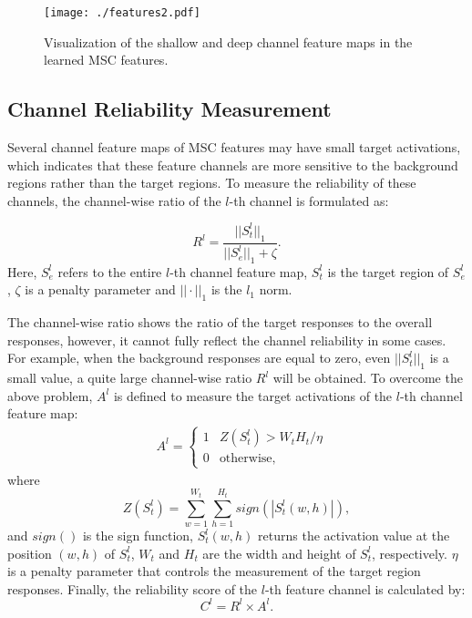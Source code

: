 \documentclass[runningheads]{llncs}
\begin{document}
\begin{figure*}[!tp]
\begin{center}
   \texttt{[image: ./features2.pdf]} %
\end{center}
 \caption{Visualization of the shallow and deep channel feature maps in the learned MSC features. }
\label{features}
\end{figure*}


\subsection{Channel Reliability Measurement}

Several channel feature maps of MSC features may have small target activations, which indicates that these feature channels are more sensitive to the background regions rather than the target regions. To measure the reliability of these channels, the channel-wise ratio of the $l$-th channel is formulated as:


\begin{equation}\label{TAR}
 R^{l} = \frac{||S_{t}^{l}||_{1}}{||S_{e}^{l}||_{1} + \zeta}.
\end{equation}
Here, $S_{e}^{l}$ refers to the entire $l$-th channel feature map, $S_{t}^{l}$ is the target region of $S_{e}^{l}$, $\zeta$ is a penalty parameter and ${||\cdot||}_{1}$ is the $l_{1}$ norm. 

The channel-wise ratio shows the ratio of the target responses to the overall responses, however, it cannot fully reflect the channel reliability in some cases. For example, when the background responses are equal to zero, even $||S_{t}^{l}||_{1}$ is a small value, a quite large channel-wise ratio $R^{l}$ will be obtained. To overcome the above problem, $A^{l}$ is defined to measure the target activations of the $l$-th channel feature map:
\begin{equation}\label{E}
\begin{split}
&  A^{l} = 
\begin{cases}
1 &  Z(S_{t}^{l})>W_{t}H_{t}/\eta  \\
0 & \text{otherwise},
\end{cases}
\end{split}
\end{equation}
where
\begin{equation}\label{E2}
Z(S_{t}^{l}) = \sum_{w=1}^{W_{t}} \sum_{h=1}^{H_t} sign(|S_{t}^{l}(w, h)|),
\end{equation}
and $sign()$ is the sign function, $S_{t}^{l}(w, h)$ returns the activation value at the position $(w, h)$ of $S_{t}^{l}$, $W_t$ and $H_t$ are the width and height of $S_{t}^{l}$, respectively. $\eta$ is a penalty parameter that controls the measurement of the target region responses. Finally, the reliability score of the $l$-th feature channel is calculated by:
\begin{equation}\label{TAR}
 C^l = R^{l} \times A^{l}.
\end{equation}
\end{document}

